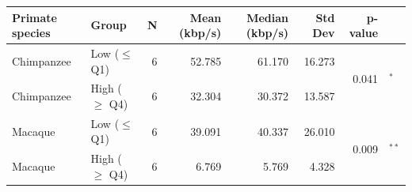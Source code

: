 \begin{tabular}{llrrrrr@{\,}l}
\toprule
Primate species & Group & N & Mean (kbp/s) & Median (kbp/s) & Std Dev & p-value &   \\
\midrule
Chimpanzee & Low ($\leq$ Q1) & 6 & 52.785 & 61.170 & 16.273 & \multirow{2}{*}{0.041} & \multirow{2}{*}{$^*$} \\
Chimpanzee & High ($\geq$ Q4) & 6 & 32.304 & 30.372 & 13.587 &  &  \\
Macaque & Low ($\leq$ Q1) & 6 & 39.091 & 40.337 & 26.010 & \multirow{2}{*}{0.009} & \multirow{2}{*}{$^{**}$} \\
Macaque & High ($\geq$ Q4) & 6 & 6.769 & 5.769 & 4.328 &  &  \\
\bottomrule
\end{tabular}
